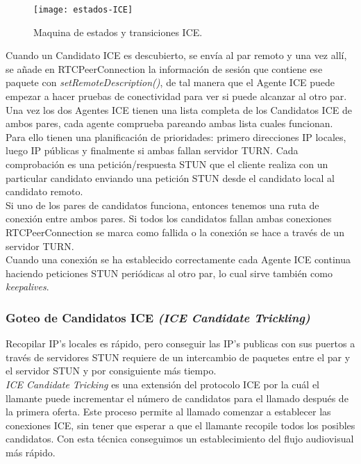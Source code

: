 \begin{figure}[htb]
\centering
\texttt{[image: estados-ICE]}
\caption{Maquina de estados y transiciones ICE.}
\label{fig:estados-ice}
\end{figure}

 
Cuando un Candidato ICE es descubierto, se envía al par remoto y una vez allí, se añade en RTCPeerConnection la información de sesión que contiene ese paquete con \textit{setRemoteDescription()}, de tal manera que el Agente ICE puede empezar a hacer pruebas de conectividad para ver si puede alcanzar al otro par.\\

Una vez los dos Agentes ICE tienen una lista completa de los Candidatos ICE de ambos pares, cada agente comprueba pareando ambas lista cuales funcionan. Para ello tienen una planificación de prioridades: primero direcciones IP locales, luego IP públicas y finalmente si ambas fallan servidor TURN. Cada comprobación es una petición/respuesta STUN que el cliente realiza con un particular candidato enviando una petición STUN desde el candidato local al candidato remoto.\\

Si uno de los pares de candidatos funciona, entonces tenemos una ruta de conexión entre ambos pares. Si todos los candidatos fallan ambas conexiones RTCPeerConnection se marca como fallida o la conexión se hace a través de un servidor TURN.\\

Cuando una conexión se ha establecido correctamente cada Agente ICE continua haciendo peticiones STUN periódicas al otro par, lo cual sirve también como \textit{keepalives}.\\

\subsubsection{Goteo de Candidatos ICE \emph{(ICE Candidate Trickling)}}

Recopilar IP's locales es rápido, pero conseguir las IP's publicas con sus puertos a través de servidores STUN requiere de un intercambio de paquetes entre el par y el servidor STUN y por consiguiente más tiempo.\\

\emph{ICE Candidate Tricking} es una extensión del protocolo ICE por la cuál el llamante puede incrementar el número de candidatos para el llamado después de la primera oferta. Este proceso permite al llamado comenzar a establecer las conexiones ICE, sin tener que esperar a que el llamante recopile todos los posibles candidatos. Con esta técnica conseguimos un establecimiento del flujo audiovisual más rápido.\\

